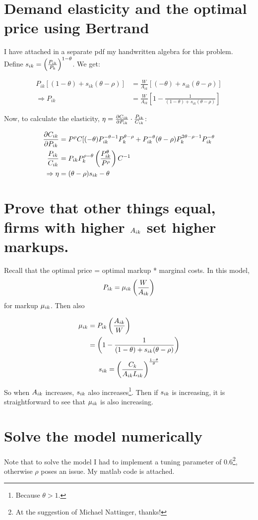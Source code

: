 \documentclass[12pt,oneside,reqno]{amsart}
\begin{document}
\section{Demand elasticity and the optimal price using Bertrand}

I have attached in a separate pdf my handwritten algebra for this problem. Define $s_{ik} = \left( \frac{P_{ik}}{P_k}\right)^{1-\theta}$.  We get:

\begin{align*}
P_{ik}[(1-\theta) +  s_{ik} (\theta - \rho)]&= \frac{W}{A_{ik}}\left[ (-\theta) + s_{ik} (\theta - \rho) \right]\\
\Rightarrow P_{ik} &= \frac{W}{A_{ik}}\left[ 1 - \frac{1}{(1-\theta) +  s_{ik} (\theta - \rho)} \right]
\end{align*}

Now, to calculate the elasticity, $\eta = \pdv {C_{ik}}{P_{ik}} \cdot \frac{P_{ik}}{C_{ik}}$:

\begin{align*}
\pdv {C_{ik}}{P_{ik}} 
& = P^\rho C [(-\theta)P_{ik} 
^{-\theta-1} P_k^{\theta-\rho} + P_{ik}^{-\theta} (\theta-\rho) P_k^{2\theta-\rho-1} P_{ik}^{-\theta}
\\
\frac{P_{ik}}{C_{ik}} & = P_{ik} P_k^{\rho-\theta} 
\left(\frac{P_{ik}^\theta}{P^\rho}\right) C^{-1} 
\\
\Rightarrow \eta & = 
(\theta - \rho)s_{ik} - \theta
\end{align*}



\section{Prove that other things equal, firms with higher $A_{ik}$ set higher markups.}
Recall that the optimal price = optimal markup * marginal costs. In this model, 
\[P_{ik} =\mu_{ik} \left(\frac{W}{A_{ik}}\right)\]
for markup $\mu_{ik}$. Then also  

\begin{align*}
\mu_{ik} & = P_{ik} \left(\frac{A_{ik}}{W}\right)
\\
& = \left( 1 - \frac{1}{(1-\theta)+s_{ik} (\theta-\rho)}\right)
\end{align*}
\[
s_{ik} = 
\left( \frac{C_k}{A_{ik} L_{ik}}\right)
^{\frac{1-\theta}{\theta}}
\]

So when $A_{ik}$ increases, $s_{ik}$ also increases\footnote{Because $\theta >1$. }. 
Then if $s_{ik}$ is increasing, it is straightforward to see that $\mu_{ik}$ is also increasing. 

\section{Solve the model numerically}
Note that to solve the model I had to implement a tuning parameter of 0.6\footnote{At the suggestion of Michael Nattinger, thanks!}, otherwise $\rho$ poses an issue.  My matlab code is attached. 
\end{document}
